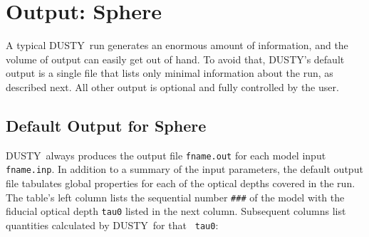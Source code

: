 \documentclass[11pt]{article}
\def\D    {{\sf DUSTY}}
\begin{document}
\section{Output: Sphere}
\label{sec:output_sph}

A typical \D\ run generates an enormous amount of information, and the
volume of output can easily get out of hand. To avoid that, \D's
default output is a single file that lists only minimal information
about the run, as described next. All other output is optional and
fully controlled by the user.

\subsection{Default Output for Sphere}
\label{sec:default_sph}

\D\ always produces the output file {\tt fname.out} for each model
input {\tt fname.inp}. In addition to a summary of the input
parameters, the default output file tabulates global properties for
each of the optical depths covered in the run. The table's left column
lists the sequential number {\tt \#\#\#} of the model with the
fiducial optical depth {\tt tau0} listed in the next column.
Subsequent columns list quantities calculated by \D\ for that {\tt
  tau0}:
\end{document}
